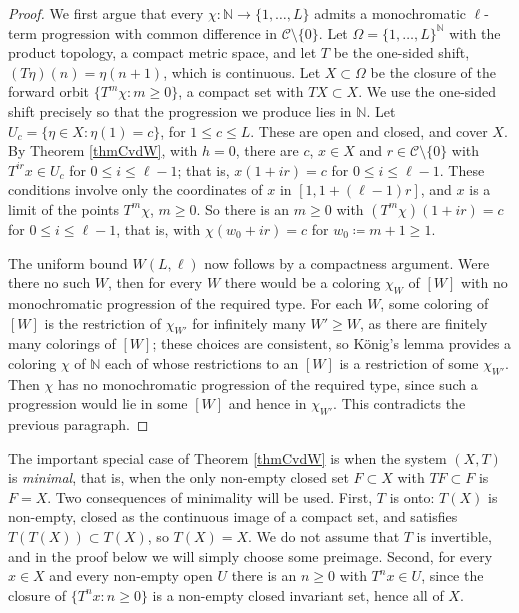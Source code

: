 \begin{proof}
We first argue that every $\chi \colon \mathbb N \to \{1 , \ldots, L\}$ admits a monochromatic $\ell$-term progression with common difference in $\mathcal C\setminus \{0\}$.  
Let $\Omega = \{1 , \ldots, L\} ^{\mathbb N}$ with the product topology, a compact metric space, and let $T$ be the one-sided shift, 
$(T \eta )(n) = \eta (n+1)$, which is continuous.  Let $X \subset \Omega$ be the closure of the forward orbit $\{ T ^{m} \chi \colon m \geq 0\}$, 
a compact set with $TX \subset X$.  We use the one-sided shift precisely so that the progression we produce lies in $\mathbb N$.  
Let $U_c = \{ \eta \in X \colon \eta (1)=c\}$, for $1 \leq c \leq L$.  
These are open and closed, and cover $X$. By Theorem \ref{thmCvdW}, with $h=0$, there are $c$, $x \in X$ and $r \in \mathcal C\setminus\{0\}$ 
with $T ^{ir}x \in U_c$ for $0 \leq i \leq \ell -1$; that is, $x(1+ir)=c$ for $0 \leq i \leq \ell-1$.  
These conditions involve only the coordinates of $x$ in $[1, 1+(\ell-1)r]$, and $x$ is a limit of the points $T ^{m} \chi$, $m \geq 0$.  
So there is an $m \geq 0$ with $(T ^{m}\chi )(1+ir) = c$ for $0 \leq i \leq \ell-1$, that is, with 
$\chi (w_0 + ir) = c$ for $w_0 \coloneqq m+1 \geq 1$.  

The uniform bound $W(L,\ell)$ now follows by a compactness argument.  Were there no such $W$, then for every $W$ there would be a coloring 
$\chi _W$ of $[W]$ with no monochromatic progression of the required type.  For each $W$, some coloring of $[W]$ is the restriction of 
$\chi _{W'}$ for infinitely many $W' \geq W$, as there are finitely many colorings of $[W]$; these choices are consistent, so 
K\"onig's lemma provides a coloring $\chi$ of $\mathbb N$ each of whose restrictions to an $[W]$ is a restriction of some $\chi _{W'}$.  
Then $\chi$ has no monochromatic progression of the required type, since such a progression would lie in some $[W]$ and hence in $\chi _{W'}$.  
This contradicts the previous paragraph. 
\end{proof}

The important special case of Theorem \ref{thmCvdW} is when the system $(X,T)$  is \emph{minimal}, that is, when the only non-empty closed set $F\subset X$ with $TF\subset F$ is $F=X$. 
Two consequences of minimality will be used.  First, $T$ is onto: $T(X)$ is non-empty, closed as the continuous image of a compact set, 
and satisfies $T(T(X)) \subset T(X)$, so $T(X)=X$.  We do not assume that $T$ is invertible, and in the proof below we will simply 
choose some preimage.  Second, for every $x \in X$ and every non-empty open $U$ there is an $n \geq 0$ with $T ^{n}x \in U$, 
since the closure of $\{T ^{n}x \colon n \geq 0\}$ is a non-empty closed invariant set, hence all of $X$.  


